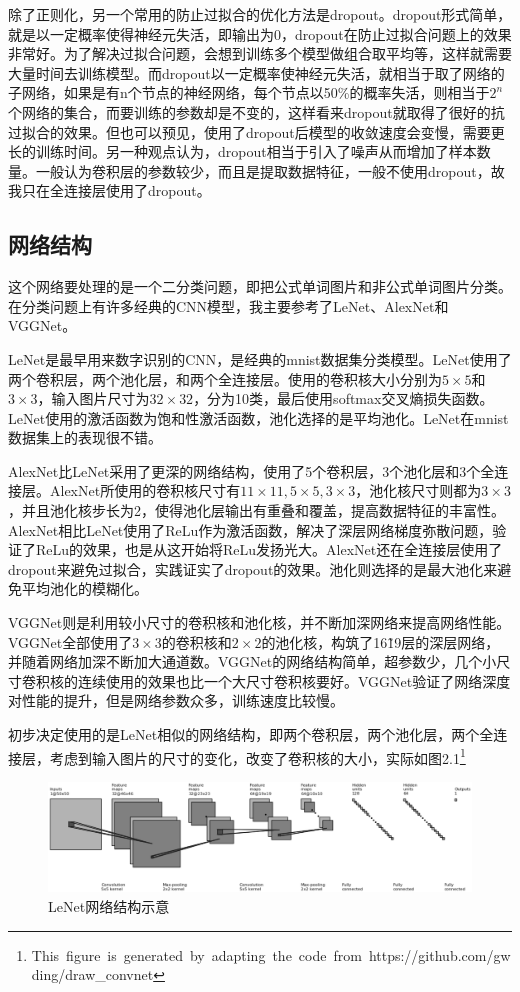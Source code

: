 除了正则化，另一个常用的防止过拟合的优化方法是dropout。\cite{dropout}dropout形式简单，就是以一定概率使得神经元失活，即输出为0，dropout在防止过拟合问题上的效果非常好。为了解决过拟合问题，会想到训练多个模型做组合取平均等，这样就需要大量时间去训练模型。而dropout以一定概率使神经元失活，就相当于取了网络的子网络，如果是有n个节点的神经网络，每个节点以50\%的概率失活，则相当于$2^n$个网络的集合，而要训练的参数却是不变的，这样看来dropout就取得了很好的抗过拟合的效果。但也可以预见，使用了dropout后模型的收敛速度会变慢，需要更长的训练时间。另一种观点认为，dropout相当于引入了噪声从而增加了样本数量。一般认为卷积层的参数较少，而且是提取数据特征，一般不使用dropout，故我只在全连接层使用了dropout。

\subsection{网络结构}
\noindent

这个网络要处理的是一个二分类问题，即把公式单词图片和非公式单词图片分类。在分类问题上有许多经典的CNN模型，我主要参考了LeNet、AlexNet和VGGNet。

LeNet是最早用来数字识别的CNN，是经典的mnist数据集分类模型。LeNet使用了两个卷积层，两个池化层，和两个全连接层。使用的卷积核大小分别为$5 \times 5$和$3 \times 3$，输入图片尺寸为$32 \times 32$，分为10类，最后使用softmax交叉熵损失函数。LeNet使用的激活函数为饱和性激活函数，池化选择的是平均池化。LeNet在mnist数据集上的表现很不错。

AlexNet比LeNet采用了更深的网络结构，使用了5个卷积层，3个池化层和3个全连接层。AlexNet所使用的卷积核尺寸有$11 \times 11, 5 \times 5, 3 \times 3$，池化核尺寸则都为$3 \times 3$，并且池化核步长为2，使得池化层输出有重叠和覆盖，提高数据特征的丰富性。AlexNet相比LeNet使用了ReLu作为激活函数，解决了深层网络梯度弥散问题，验证了ReLu的效果，也是从这开始将ReLu发扬光大。AlexNet还在全连接层使用了dropout来避免过拟合，实践证实了dropout的效果。池化则选择的是最大池化来避免平均池化的模糊化。

VGGNet则是利用较小尺寸的卷积核和池化核，并不断加深网络来提高网络性能。VGGNet全部使用了$3 \times 3$的卷积核和$2 \times 2$的池化核，构筑了16\~19层的深层网络，并随着网络加深不断加大通道数。VGGNet的网络结构简单，超参数少，几个小尺寸卷积核的连续使用的效果也比一个大尺寸卷积核要好。VGGNet验证了网络深度对性能的提升，但是网络参数众多，训练速度比较慢。

初步决定使用的是LeNet相似的网络结构，即两个卷积层，两个池化层，两个全连接层，考虑到输入图片的尺寸的变化，改变了卷积核的大小，实际如图2.1\footnote{\hbox{This figure is generated by adapting the code from https://github.com/gwding/draw\_convnet}}

\begin{figure}[ht]
    \centering
    \hbox{\includegraphics[scale=0.5]{eps/lenet.eps}}
    \caption{LeNet网络结构示意}
    \label{fig:label}
\end{figure}
